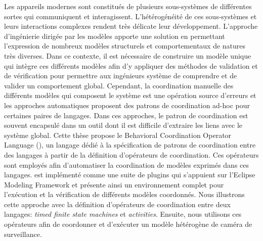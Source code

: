 
\begin{frenchabstract}
Les appareils modernes sont constitués de plusieurs sous-systèmes de différentes sortes qui communiquent et interagissent. L'hétérogénéité de ces sous-systèmes et leurs interactions complexes rendent très délicate leur développement. L'approche d'ingénierie dirigée par les modèles apporte une solution en permettant l'expression de nombreux modèles structurels et comportementaux de natures très diverses. Dans ce contexte, il est nécessaire de construire un modèle unique qui intègre ces différents modèles afin d'y appliquer des méthodes de validation et de vérification pour permettre aux ingénieurs système de comprendre et de valider un comportement global. Cependant, la coordination manuelle des différents modèles qui composent le système est une opération source d'erreurs et les approches automatiques proposent des patrons de coordination ad-hoc pour certaines paires de langages. Dans ces approches, le patron de coordination est souvent encapsulé dans un outil dont il est difficile d'extraire les liens avec le système global. Cette thèse propose le Behavioral Coordination Operator Language (\bcool), un langage dédié à la spécification de patrons de coordination entre des langages à partir de la définition d'opérateurs de coordination. Ces opérateurs sont employés afin d'automatiser la coordination de modèles exprimés dans ces langages. \bcool est implémenté comme une suite de plugins qui s'appuient sur l'Eclipse Modeling Framework et présente ainsi un environnement complet pour l'exécution et la vérification de différents modèles coordonnés. Nous illustrons cette approche avec la définition d'opérateurs de coordination entre deux langages: \emph{timed finite state machines} et  \emph{activities}. Ensuite, nous utilisons ces opérateurs afin de coordonner et d'exécuter un modèle hétérogène de caméra de surveillance.
\end{frenchabstract}



\cleardoublepage
{}


